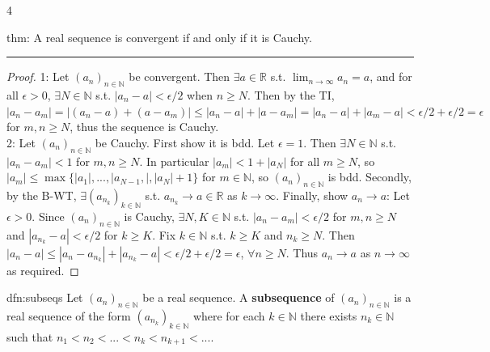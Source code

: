 \documentclass[landscape, 8pt]{extarticle}
\begin{document}
\begin{multicols*}{4}
		
		\begin{mthm}{thm:}{ }
			A real sequence is convergent if and only if it is Cauchy.
			\vspace{1pt}
			\hrule	
			\vspace{-6pt}
			\begin{proof}
				1: Let $(a_n)_{n\in \mathbb{N}}$ be convergent. Then $\exists a\in\mathbb{R}$ s.t. $\lim_{n\to \infty}a_n = a$, and for all $ \epsilon > 0$, $\exists N\in \mathbb{N}$ s.t. $\left|a_n -a\right| <\epsilon/2$ when $n \ge N$. Then by the TI, $\left|a_n - a_m\right| = \left|(a_n-a) + (a-a_m)\right| \le \left|a_n - a\right| + \left|a-a_m\right| = \left|a_n - a\right| + \left|a_m -a\right| <\epsilon/2 +\epsilon/2 =\epsilon$ for $m, n \ge N$, thus the sequence is Cauchy.\\
				2: Let $(a_n)_{n\in \mathbb{N}}$ be Cauchy. First show it is bdd. Let $\epsilon = 1$. Then $\exists N\in \mathbb{N}$ s.t. $\left|a_n -a_m\right| < 1$ for $m, n \ge N$. In particular $\left|a_m\right| < 1+\left|a_N\right|$ for all $m \ge N$, so $\left|a_m\right| \le \max\{\left|a_1\right|, ..., \left|a_{N-1},\right|, \left|a_N\right| + 1\}$ for $m\in \mathbb{N}$, so $(a_n)_{n\in \mathbb{N}}$ is bdd. Secondly, by the B-WT, $\exists (a_{n_k})_{k\in \mathbb{N}}$ s.t. $a_{n_k} \to a\in \mathbb{R}$ as $k \to \infty$. Finally, show $a_n \to a$: Let $\epsilon > 0$. Since $(a_n)_{n\in \mathbb{N}}$ is Cauchy, $\exists N, K\in \mathbb{N}$ s.t. $\left|a_n - a_m\right| <\epsilon/2$ for $m, n \ge N$ and $\left|a_{n_k} - a \right| <\epsilon/2$ for $k \ge K$. Fix $k\in \mathbb{N}$ s.t. $k\ge K$ and $n_k \ge N$. Then $\left|a_n - a\right| \le \left|a_n - a_{n_k}\right| + \left|a_{n_k} - a\right| <\epsilon/2 +\epsilon/2 =\epsilon$, $\forall n \ge N$. Thus $a_n \to a$ as $n \to \infty$ as required.
			\end{proof}
			
		\end{mthm}
		
		
		\begin{dfn}[Subsequences]{dfn:subseqs}{ }
			Let $(a_n)_{n \in \mathbb{N}}$ be a real sequence. A \textbf{subsequence} of $(a_n)_{n \in \mathbb{N}}$ is a real sequence of the form $(a_{n_k})_{k \in \mathbb{N}}$ where for each $k \in \mathbb{N}$ there exists $n_k \in \mathbb{N}$ such that $n_1 < n_2< ... < n_k < n_{k+1} < ...$.
			
		\end{dfn}
		

\end{multicols*}
\end{document}
